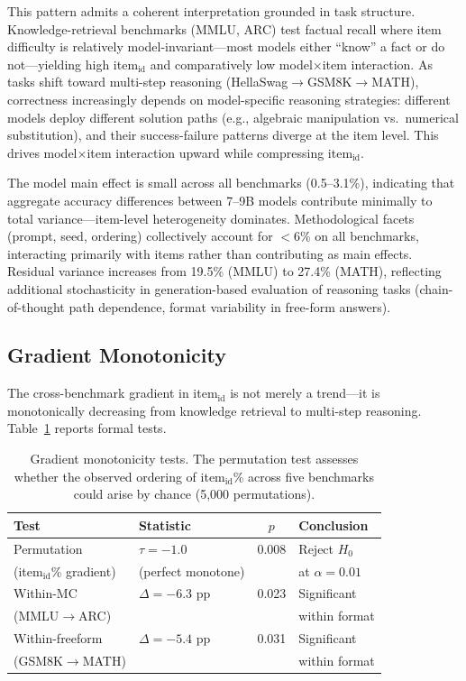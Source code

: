 \documentclass[letterpaper,11pt]{article}
\begin{document}
This pattern admits a coherent interpretation grounded in task structure.
Knowledge-retrieval benchmarks (MMLU, ARC) test factual recall where item difficulty is relatively model-invariant---most models either ``know'' a fact or do not---yielding high item$_{\text{id}}$ and comparatively low model$\times$item interaction.
As tasks shift toward multi-step reasoning (HellaSwag$\to$GSM8K$\to$MATH), correctness increasingly depends on model-specific reasoning strategies: different models deploy different solution paths (e.g., algebraic manipulation vs.\ numerical substitution), and their success-failure patterns diverge at the item level.
This drives model$\times$item interaction upward while compressing item$_{\text{id}}$.

The model main effect is small across all benchmarks (0.5--3.1\%), indicating that aggregate accuracy differences between 7--9B models contribute minimally to total variance---item-level heterogeneity dominates.
Methodological facets (prompt, seed, ordering) collectively account for $<$6\% on all benchmarks, interacting primarily with items rather than contributing as main effects.
Residual variance increases from 19.5\% (MMLU) to 27.4\% (MATH), reflecting additional stochasticity in generation-based evaluation of reasoning tasks (chain-of-thought path dependence, format variability in free-form answers).

\subsection{Gradient Monotonicity}
\label{sec:gradient}

The cross-benchmark gradient in item$_{\text{id}}$ is not merely a trend---it is monotonically decreasing from knowledge retrieval to multi-step reasoning.
Table~\ref{tab:monotonicity} reports formal tests.

\begin{table}[t]
\centering
\caption{Gradient monotonicity tests. The permutation test assesses whether the observed ordering of item$_{\text{id}}$\% across five benchmarks could arise by chance (5,000 permutations).}
\label{tab:monotonicity}
\small
\begin{tabular}{llcl}
\toprule
\textbf{Test} & \textbf{Statistic} & \textbf{$p$} & \textbf{Conclusion} \\
\midrule
Permutation & $\tau = -1.0$ & 0.008 & Reject $H_0$ \\
 (item$_{\text{id}}$\% gradient) & (perfect monotone) & & at $\alpha = 0.01$ \\
\addlinespace
Within-MC & $\Delta = -6.3$ pp & 0.023 & Significant \\
(MMLU$\to$ARC) & & & within format \\
\addlinespace
Within-freeform & $\Delta = -5.4$ pp & 0.031 & Significant \\
(GSM8K$\to$MATH) & & & within format \\
\bottomrule
\end{tabular}
\end{table}
\end{document}
